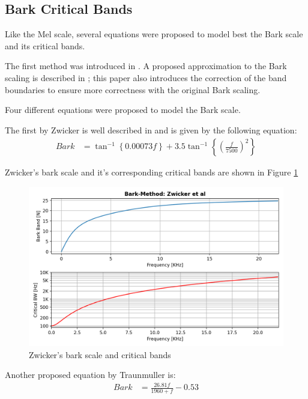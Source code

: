 \subsection{Bark Critical Bands}
Like the Mel scale, several equations were proposed to model best
the Bark scale and its critical bands.

The first method was introduced in \cite{1908630}.
A proposed approximation to the Bark scaling is described in 
\cite{TraunmullerScale}; this paper also introduces the 
correction of the band boundaries to ensure more 
correctness with the original Bark scaling.

Four different equations were proposed to model
the Bark scale.

The first by Zwicker is well described in\cite{1908630} and
is given by the following equation:
\begin{align}%
    Bark & = \tan^{-1}\left\{ 0.00073f \right\} + 3.5 \tan^{-1}\left\{ 
            \left( \frac{f}{7500} \right)^{2}
        \right\}
\end{align}

Zwicker's bark scale and it's corresponding critical bands
are shown in Figure \ref{fig:Zwicker_bark}
\begin{figure}[H]
    \centering
    \includegraphics[width=0.75\linewidth]{Experiments/images/Zwicker}
    \caption{Zwicker's bark scale and critical bands}\label{fig:Zwicker_bark}
\end{figure}

Another proposed equation by Traunmuller \cite{TraunmullerScale} is:
\begin{align}\label{eq:traunmuller_no_fix}%
    Bark & = \frac{26.81f}{1960 + f} - 0.53
\end{align}

